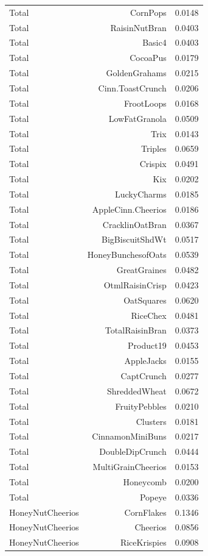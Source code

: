 \begin{longtable}{@{}lrr@{}}
Total & CornPops & 0.0148 \\
Total & RaisinNutBran & 0.0403 \\
Total & Basic4 & 0.0403 \\
Total & CocoaPus & 0.0179 \\
Total & GoldenGrahams & 0.0215 \\
Total & Cinn.ToastCrunch & 0.0206 \\
Total & FrootLoops & 0.0168 \\
Total & LowFatGranola & 0.0509 \\
Total & Trix & 0.0143 \\
Total & Triples & 0.0659 \\
Total & Crispix & 0.0491 \\
Total & Kix & 0.0202 \\
Total & LuckyCharms & 0.0185 \\
Total & AppleCinn.Cheerios & 0.0186 \\
Total & CracklinOatBran & 0.0367 \\
Total & BigBiscuitShdWt & 0.0517 \\
Total & HoneyBunchesofOats & 0.0539 \\
Total & GreatGraines & 0.0482 \\
Total & OtmlRaisinCrisp & 0.0423 \\
Total & OatSquares & 0.0620 \\
Total & RiceChex & 0.0481 \\
Total & TotalRaisinBran & 0.0373 \\
Total & Product19 & 0.0453 \\
Total & AppleJacks & 0.0155 \\
Total & CaptCrunch & 0.0277 \\
Total & ShreddedWheat & 0.0672 \\
Total & FruityPebbles & 0.0210 \\
Total & Clusters & 0.0181 \\
Total & CinnamonMiniBuns & 0.0217 \\
Total & DoubleDipCrunch & 0.0444 \\
Total & MultiGrainCheerios & 0.0153 \\
Total & Honeycomb & 0.0200 \\
Total & Popeye & 0.0336 \\
HoneyNutCheerios & CornFlakes & 0.1346 \\
HoneyNutCheerios & Cheerios & 0.0856 \\
HoneyNutCheerios & RiceKrispies & 0.0908 \\

\end{longtable}
